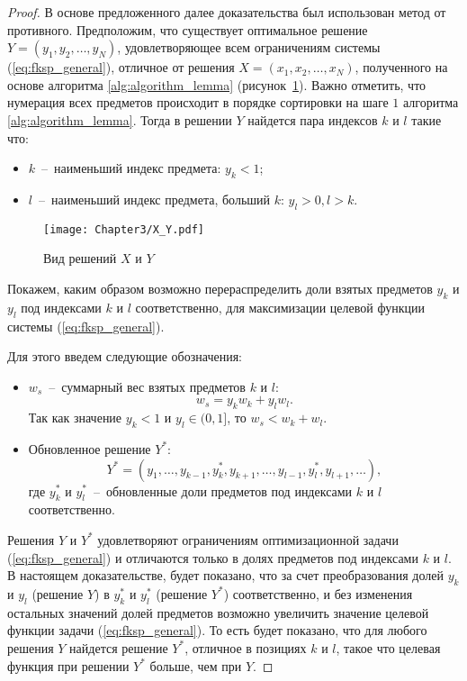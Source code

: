 \begin{proof}

В основе предложенного далее доказательства был использован метод от противного. Предположим, что существует оптимальное решение $Y = (y_1, y_2, \ldots, y_N)$, удовлетворяющее всем ограничениям системы (\ref{eq:fksp_general}), отличное от решения $X = (x_1, x_2, \ldots, x_N)$, полученного на основе алгоритма \ref{alg:algorithm_lemma} (рисунок~\ref{fig:X_Y_Solutions}). Важно отметить, что нумерация всех предметов происходит в порядке сортировки на шаге $1$ алгоритма \ref{alg:algorithm_lemma}. Тогда в решении $Y$ найдется пара индексов $k$ и $l$ такие что:
\begin{itemize}
	\item $k$~--~наименьший индекс предмета: $y_k < 1$;
	\item $l$~--~наименьший индекс предмета, больший $k$: $y_l > 0, l>k$.
\end{itemize}

\begin{figure}[htbp]
\begin{center}
\texttt{[image: Chapter3/X\_Y.pdf]}
\caption{Вид решений $X$ и $Y$}
\label{fig:X_Y_Solutions}
\end{center}
\end{figure}

Покажем, каким образом возможно перераспределить доли взятых предметов $y_k$ и $y_l$ под индексами $k$ и $l$ соответственно, для максимизации целевой функции системы (\ref{eq:fksp_general}).

Для этого введем следующие обозначения:
\begin{itemize}
	\item $w_{s}$~--~суммарный вес взятых предметов $k$ и $l$: $$w_{s} = y_k w_k + y_l w_l.$$ Так как значение $y_k < 1$ и $y_l \in (0, 1]$, то $w_{s} < w_k + w_l$.
	\item Обновленное решение $Y^{*}$: $$Y^{*}=(y_1, \ldots, y_{k-1}, y_k^{*}, y_{k+1}, \ldots, y_{l-1}, y_l^{*}, y_{l+1}, \ldots),$$ где $y_k^{*}$ и $y_l^{*}$~--~обновленные доли предметов под индексами $k$ и $l$ соответственно.
\end{itemize}

Решения $Y$ и $Y^{*}$ удовлетворяют ограничениям оптимизационной задачи (\ref{eq:fksp_general}) и отличаются только в долях предметов под индексами $k$ и $l$. В настоящем доказательстве, будет показано, что за счет преобразования долей $y_k$ и $y_l$ (решение $Y$) в $y_k^{*}$ и $y_l^{*}$ (решение $Y^{*}$) соответственно, и без изменения остальных значений долей предметов возможно увеличить значение целевой функции задачи (\ref{eq:fksp_general}). То есть будет показано, что для любого решения $Y$ найдется решение $Y^{*}$, отличное в позициях $k$ и $l$, такое что целевая функция при решении $Y^{*}$ больше, чем при $Y$.


\end{proof}
